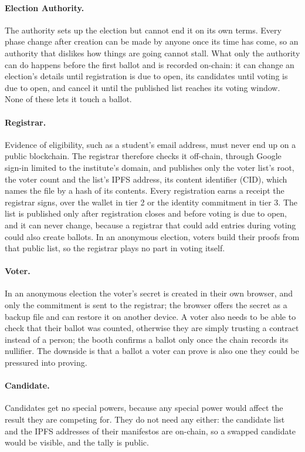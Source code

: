 \paragraph{Election Authority.}
The authority sets up the election but cannot end it on its own terms. Every
phase change after creation can be made by anyone once its time has come, so an
authority that dislikes how things are going cannot stall. What only the
authority can do happens before the first ballot and is recorded on-chain: it
can change an election's details until registration is due to open, its
candidates until voting is due to open, and cancel it until the published list
reaches its voting window. None of these lets it touch a ballot.

\paragraph{Registrar.}
Evidence of eligibility, such as a student's email address, must never end up
on a public blockchain. The registrar therefore checks it off-chain, through
Google sign-in limited to the institute's domain, and publishes only the voter list's
root, the voter count and the list's IPFS address, its content identifier
(CID), which names the file by a hash of its contents. Every registration
earns a receipt the registrar signs, over the wallet in tier 2 or the identity
commitment in tier 3. The list is published only after registration closes and
before voting is due to open, and it can never change, because a registrar that
could add entries during voting could also create ballots. In an anonymous
election, voters build their proofs from that public list, so the registrar
plays no part in voting itself.

\paragraph{Voter.}
In an anonymous election the voter's secret is created in their own browser,
and only the commitment is sent to the registrar; the browser offers the secret
as a backup file and can restore it on another device. A voter also needs to be
able to check that their ballot was counted, otherwise they are simply trusting
a contract instead of a person; the booth confirms a ballot only once the chain
records its nullifier. The downside is that a ballot a voter can prove is also
one they could be pressured into proving.

\paragraph{Candidate.}
Candidates get no special powers, because any special power would affect the
result they are competing for. They do not need any either: the candidate list
and the IPFS addresses of their manifestos are on-chain, so a swapped candidate
would be visible, and the tally is public.

